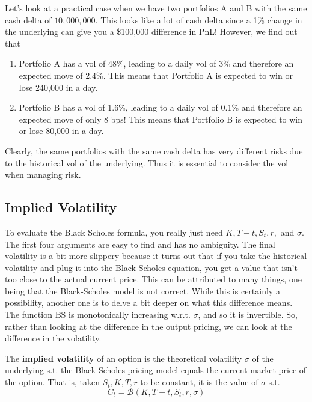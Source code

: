 \documentclass{article}
\begin{document}
    \begin{example}
      \label{ex:cash-delta}
      Let's look at a practical case when we have two portfolios A and B with the same cash delta of $10,000,000$. This looks like a lot of cash delta since a 1\% change in the underlying can give you a \$100,000 difference in PnL! However, we find out that 
      \begin{enumerate}
        \item Portfolio A has a vol of 48\%, leading to a daily vol of 3\% and therefore an expected move of 2.4\%. This means that Portfolio A is expected to win or lose 240,000 in a day.  
        \item Portfolio B has a vol of 1.6\%, leading to a daily vol of 0.1\% and therefore an expected move of only 8 bps! This means that Portfolio B is expected to win or lose 80,000 in a day. 
      \end{enumerate}
      Clearly, the same portfolios with the same cash delta has very different risks due to the historical vol of the underlying. Thus it is essential to consider the vol when managing risk. 
    \end{example}

  \subsection{Implied Volatility}

    To evaluate the Black Scholes formula, you really just need $K, T - t, S_t, r,$ and $\sigma$. The first four arguments are easy to find and has no ambiguity. The final volatility is a bit more slippery because it turns out that if you take the historical volatility and plug it into the Black-Scholes equation, you get a value that isn't too close to the actual current price. This can be attributed to many things, one being that the Black-Scholes model is not correct. While this is certainly a possibility, another one is to delve a bit deeper on what this difference means. The function $\mathrm{BS}$ is monotonically increasing w.r.t. $\sigma$, and so it is invertible. So, rather than looking at the difference in the output pricing, we can look at the difference in the volatility. 

    \begin{definition}
      \label{def:implied-volatility}
      The \textbf{implied volatility} of an option is the theoretical volatility $\sigma$ of the underlying s.t. the Black-Scholes pricing model equals the current market price of the option. That is, taken $S_t, K, T, r$ to be constant, it is the value of $\sigma$ s.t. 
      \begin{equation}
        C_t = \mathcal{B}(K, T - t, S_t, r, \sigma)
      \end{equation}
    \end{definition}
\end{document}
